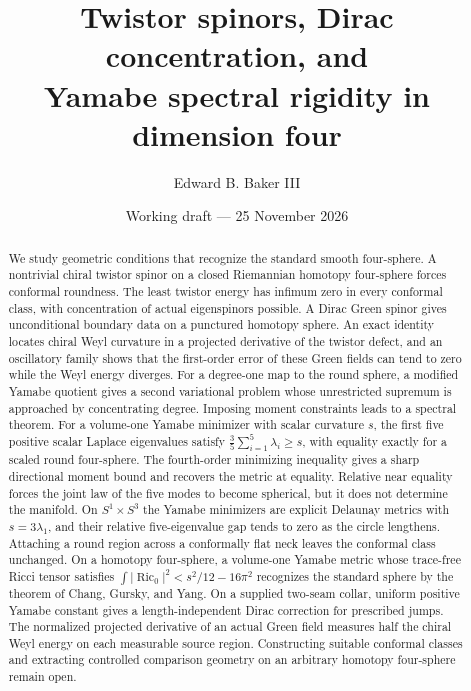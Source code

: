 \documentclass[11pt]{article}
\title{Twistor spinors, Dirac concentration, and\\
Yamabe spectral rigidity in dimension four}
\author{Edward B. Baker III}
\date{Working draft --- 25 November 2026}
\numberwithin{equation}{section}
\DeclareMathOperator{\Ric}{Ric}
\newcommand{\abs}[1]{\lvert #1\rvert}
\begin{document}
\maketitle
\thispagestyle{plain}

\begin{abstract}
We study geometric conditions that recognize the standard smooth
four-sphere. A nontrivial chiral twistor spinor on a closed Riemannian
homotopy four-sphere forces conformal roundness. The least twistor
energy has infimum zero in every conformal class, with concentration of
actual eigenspinors possible. A Dirac Green spinor gives unconditional
boundary data on a punctured homotopy sphere. An exact identity locates
chiral Weyl curvature in a projected derivative of the twistor defect,
and an oscillatory family shows that the first-order error of these
Green fields can tend to zero while the Weyl energy diverges. For a
degree-one map to the round sphere, a modified Yamabe quotient gives a
second variational problem whose unrestricted supremum is approached
by concentrating degree. Imposing moment constraints leads to a
spectral theorem. For a volume-one Yamabe minimizer with scalar
curvature \(s\), the first five positive scalar Laplace eigenvalues
satisfy \(\frac35\sum_{i=1}^5\lambda_i\ge s\), with equality exactly for
a scaled round four-sphere. The fourth-order minimizing inequality
gives a sharp directional moment bound and recovers the metric at
equality. Relative near equality forces the joint law of the five
modes to become spherical, but it does not determine the manifold.
On \(S^1\times S^3\) the Yamabe minimizers are explicit Delaunay
metrics with \(s=3\lambda_1\), and their relative five-eigenvalue gap
tends to zero as the circle lengthens. Attaching a round region across
a conformally flat neck leaves the conformal class unchanged. On a
homotopy four-sphere, a volume-one Yamabe metric whose trace-free Ricci
tensor satisfies \(\int\abs{\Ric_0}^2<s^2/12-16\pi^2\) recognizes the
standard sphere by the theorem of Chang, Gursky, and Yang.
On a supplied two-seam collar, uniform positive Yamabe constant gives
a length-independent Dirac correction for prescribed jumps.
The normalized projected derivative of an actual Green field
measures half the chiral Weyl energy on each measurable source
region. Constructing suitable conformal classes and extracting
controlled comparison geometry on an arbitrary homotopy four-sphere
remain open.
\end{abstract}

\tableofcontents
\clearpage
\end{document}
